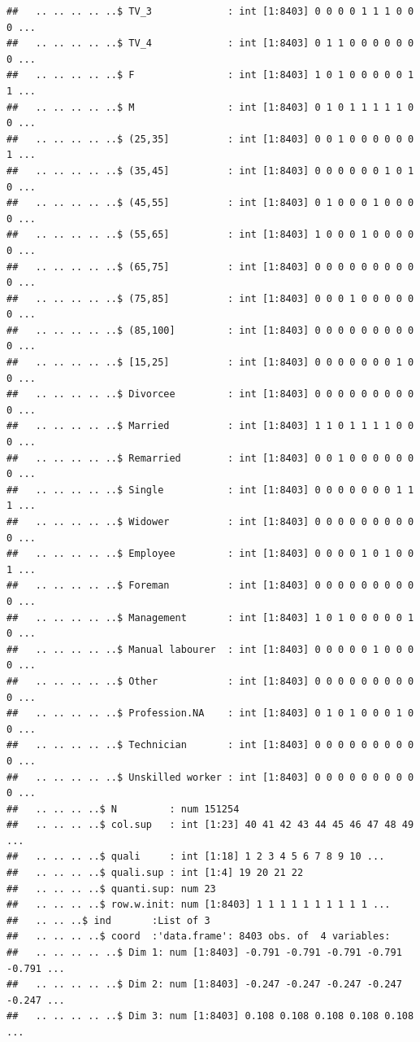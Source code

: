 \documentclass[]{book}
\begin{document}
\begin{verbatim}
##   .. .. .. .. ..$ TV_3             : int [1:8403] 0 0 0 0 1 1 1 0 0 0 ...
##   .. .. .. .. ..$ TV_4             : int [1:8403] 0 1 1 0 0 0 0 0 0 0 ...
##   .. .. .. .. ..$ F                : int [1:8403] 1 0 1 0 0 0 0 0 1 1 ...
##   .. .. .. .. ..$ M                : int [1:8403] 0 1 0 1 1 1 1 1 0 0 ...
##   .. .. .. .. ..$ (25,35]          : int [1:8403] 0 0 1 0 0 0 0 0 0 1 ...
##   .. .. .. .. ..$ (35,45]          : int [1:8403] 0 0 0 0 0 0 1 0 1 0 ...
##   .. .. .. .. ..$ (45,55]          : int [1:8403] 0 1 0 0 0 1 0 0 0 0 ...
##   .. .. .. .. ..$ (55,65]          : int [1:8403] 1 0 0 0 1 0 0 0 0 0 ...
##   .. .. .. .. ..$ (65,75]          : int [1:8403] 0 0 0 0 0 0 0 0 0 0 ...
##   .. .. .. .. ..$ (75,85]          : int [1:8403] 0 0 0 1 0 0 0 0 0 0 ...
##   .. .. .. .. ..$ (85,100]         : int [1:8403] 0 0 0 0 0 0 0 0 0 0 ...
##   .. .. .. .. ..$ [15,25]          : int [1:8403] 0 0 0 0 0 0 0 1 0 0 ...
##   .. .. .. .. ..$ Divorcee         : int [1:8403] 0 0 0 0 0 0 0 0 0 0 ...
##   .. .. .. .. ..$ Married          : int [1:8403] 1 1 0 1 1 1 1 0 0 0 ...
##   .. .. .. .. ..$ Remarried        : int [1:8403] 0 0 1 0 0 0 0 0 0 0 ...
##   .. .. .. .. ..$ Single           : int [1:8403] 0 0 0 0 0 0 0 1 1 1 ...
##   .. .. .. .. ..$ Widower          : int [1:8403] 0 0 0 0 0 0 0 0 0 0 ...
##   .. .. .. .. ..$ Employee         : int [1:8403] 0 0 0 0 1 0 1 0 0 1 ...
##   .. .. .. .. ..$ Foreman          : int [1:8403] 0 0 0 0 0 0 0 0 0 0 ...
##   .. .. .. .. ..$ Management       : int [1:8403] 1 0 1 0 0 0 0 0 1 0 ...
##   .. .. .. .. ..$ Manual labourer  : int [1:8403] 0 0 0 0 0 1 0 0 0 0 ...
##   .. .. .. .. ..$ Other            : int [1:8403] 0 0 0 0 0 0 0 0 0 0 ...
##   .. .. .. .. ..$ Profession.NA    : int [1:8403] 0 1 0 1 0 0 0 1 0 0 ...
##   .. .. .. .. ..$ Technician       : int [1:8403] 0 0 0 0 0 0 0 0 0 0 ...
##   .. .. .. .. ..$ Unskilled worker : int [1:8403] 0 0 0 0 0 0 0 0 0 0 ...
##   .. .. .. ..$ N         : num 151254
##   .. .. .. ..$ col.sup   : int [1:23] 40 41 42 43 44 45 46 47 48 49 ...
##   .. .. .. ..$ quali     : int [1:18] 1 2 3 4 5 6 7 8 9 10 ...
##   .. .. .. ..$ quali.sup : int [1:4] 19 20 21 22
##   .. .. .. ..$ quanti.sup: num 23
##   .. .. .. ..$ row.w.init: num [1:8403] 1 1 1 1 1 1 1 1 1 1 ...
##   .. .. ..$ ind       :List of 3
##   .. .. .. ..$ coord  :'data.frame': 8403 obs. of  4 variables:
##   .. .. .. .. ..$ Dim 1: num [1:8403] -0.791 -0.791 -0.791 -0.791 -0.791 ...
##   .. .. .. .. ..$ Dim 2: num [1:8403] -0.247 -0.247 -0.247 -0.247 -0.247 ...
##   .. .. .. .. ..$ Dim 3: num [1:8403] 0.108 0.108 0.108 0.108 0.108 ...

\end{verbatim}
\end{document}

